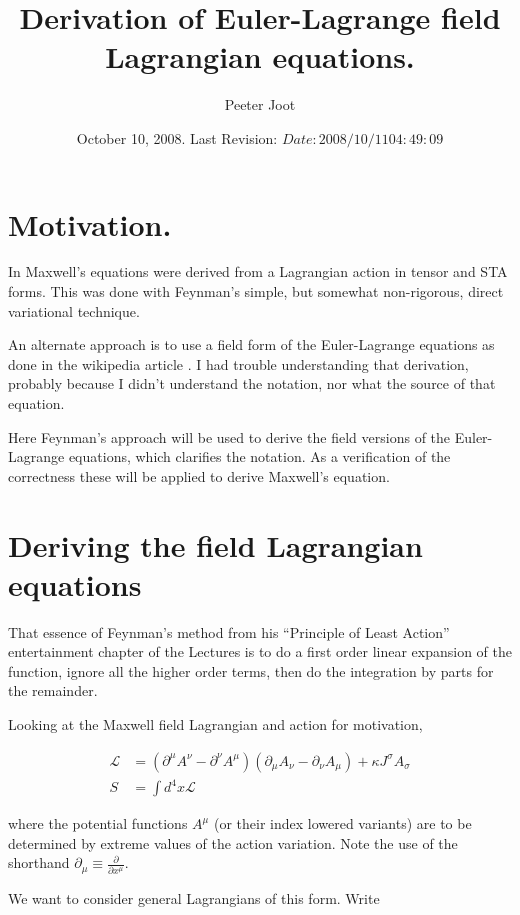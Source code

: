 \documentclass{article}
\title{ Derivation of Euler-Lagrange field Lagrangian equations.}
\author{Peeter Joot}
\date{ October 10, 2008.  Last Revision: $Date: 2008/10/11 04:49:09 $ }
\newcommand{\LL}[0]{\mathcal{L}}
\newcommand{\PD}[2]{\frac{\partial {#2}}{\partial {#1}}}
\begin{document}
\maketitle{}

\tableofcontents

\section{ Motivation. }

In \cite{PJMaxwellLagrangian} Maxwell's equations were derived from
a Lagrangian action in tensor and STA forms.  This was done with 
Feynman's \cite{feynman1963flp} simple, but somewhat non-rigorous, direct variational technique.

An alternate approach is to use a field form of the Euler-Lagrange
equations as done in the wikipedia article \cite{wikiemtensor}.  I had
trouble understanding that derivation, probably because
I didn't understand the notation, nor what the source of that equation.

Here Feynman's approach will be used to derive the field versions of the Euler-Lagrange
equations, which clarifies the notation.  As a verification of the correctness these
will be applied to derive Maxwell's equation.

\section{ Deriving the field Lagrangian equations }

That essence of Feynman's method from his 
``Principle of Least Action'' entertainment chapter of the Lectures is
to do a first order linear expansion of the function, ignore all the higher order terms,
then do the integration by parts for the remainder.

Looking at the Maxwell field Lagrangian and action for motivation,

\begin{align*}
\LL &= (\partial^\mu A^\nu - \partial^\nu A^\mu) (\partial_\mu A_\nu - \partial_\nu A_\mu) + \kappa J^\sigma A_\sigma \\
S &= \int d^4 x \LL
\end{align*}

where the potential functions $A^\mu$ (or their index lowered variants)
are to be determined by extreme values of the action variation.  Note the use of the shorthand
$\partial_\mu \equiv \PD{x^\mu}{}$.

We want to consider general Lagrangians of this form.  Write
\end{document}
